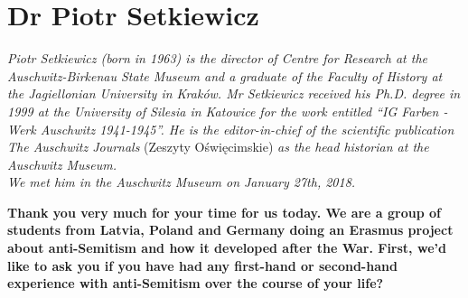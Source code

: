 \section{Dr Piotr Setkiewicz}

\textit{Piotr Setkiewicz (born in 1963) is the director of Centre for Research at the Auschwitz-Birkenau State Museum and a graduate of the Faculty of History at the Jagiellonian University in Kraków. Mr Setkiewicz received his Ph.D. degree in 1999 at the University of Silesia in Katowice for the work entitled ``IG Farben - Werk Auschwitz 1941-1945''. He is the editor-in-chief of the scientific publication The Auschwitz Journals} (Zeszyty Oświęcimskie) \textit{as the head historian at the Auschwitz Museum.\\
We met him in the Auschwitz Museum on January 27th, 2018.}\par 
\vspace*{2em}
\textbf{Thank you very much for your time for us today. We are a group of students from Latvia, Poland and Germany doing an Erasmus project about anti-Semitism and how it developed after the War. First, we'd like to ask you if you have had any first-hand or second-hand experience with anti-Semitism over the course of your life?}

